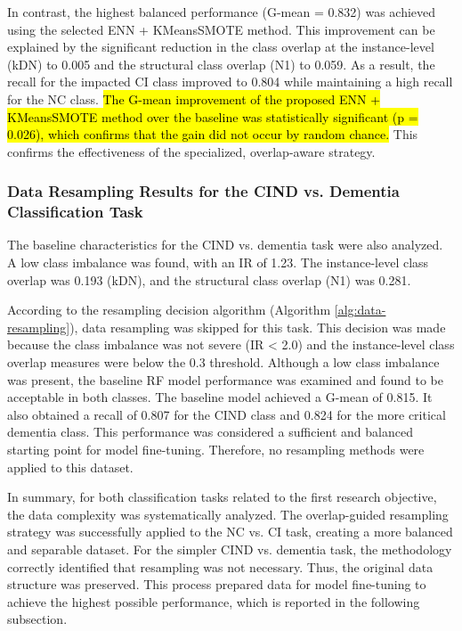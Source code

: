 In contrast, the highest balanced performance (G-mean = 0.832) was achieved using the selected ENN + KMeansSMOTE method. This improvement can be explained by the significant reduction in the class overlap at the instance-level (kDN) to 0.005 and the structural class overlap (N1) to 0.059.  As a result, the recall for the impacted CI class improved to 0.804 while maintaining a high recall for the NC class. \hl{The G-mean improvement of the proposed ENN + KMeansSMOTE method over the baseline was statistically significant (p = 0.026), which confirms that the gain did not occur by random chance.} This confirms the effectiveness of the specialized, overlap-aware strategy.

\subsubsection{Data Resampling Results for the CIND vs. Dementia Classification Task}
\label{sec:resampling_cind_dem}
The baseline characteristics for the CIND vs. dementia task were also analyzed. A low class imbalance was found, with an IR of 1.23. The instance-level class overlap was 0.193 (kDN), and the structural class overlap (N1) was 0.281.

According to the resampling decision algorithm (Algorithm \ref{alg:data-resampling}), data resampling was skipped for this task. This decision was made because the class imbalance was not severe (IR < 2.0) and the instance-level class overlap measures were below the 0.3 threshold. Although a low class imbalance was present, the baseline RF model performance was examined and found to be acceptable in both classes. The baseline model achieved a G-mean of 0.815. It also obtained a recall of 0.807 for the CIND class and 0.824 for the more critical dementia class. This performance was considered a sufficient and balanced starting point for model fine-tuning. Therefore, no resampling methods were applied to this dataset.

In summary, for both classification tasks related to the first research objective, the data complexity was systematically analyzed. The overlap-guided resampling strategy was successfully applied to the NC vs. CI task, creating a more balanced and separable dataset. For the simpler CIND vs. dementia task, the methodology correctly identified that resampling was not necessary. Thus, the original data structure was preserved. This process prepared data for model fine-tuning to achieve the highest possible performance, which is reported in the following subsection.

